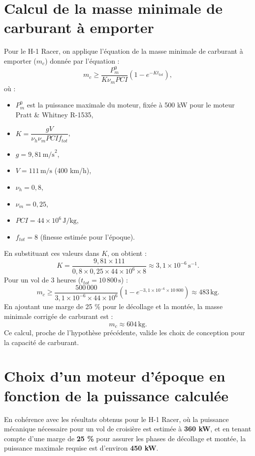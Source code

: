 \documentclass[12pt,a4paper]{article}
\begin{document}
\section{Calcul de la masse minimale de carburant à emporter}

Pour le H-1 Racer, on applique l’équation de la masse minimale de carburant à emporter ($m_c$) donnée par l’équation :
\[
m_c \geq \frac{P_m^0}{K \nu_m PCI} \left( 1 - e^{-K t_{tot}} \right),
\]
où :
\begin{itemize}
    \item $P_m^0$ est la puissance maximale du moteur, fixée à 500 kW pour le moteur Pratt \& Whitney R-1535,
    \item $K = \dfrac{gV}{\nu_h \nu_m PCI f_{tot}}$,
    \item $g = 9{,}81 \, \text{m/s}^2$,
    \item $V = 111 \, \text{m/s}$ (400 km/h),
    \item $\nu_h = 0{,}8$,
    \item $\nu_m = 0{,}25$,
    \item $PCI = 44 \times 10^6 \, \text{J/kg}$,
    \item $f_{tot} = 8$ (finesse estimée pour l’époque).
\end{itemize}

En substituant ces valeurs dans $K$, on obtient :
\[
K = \frac{9{,}81 \times 111}{0{,}8 \times 0{,}25 \times 44 \times 10^6 \times 8} \approx 3{,}1 \times 10^{-6} \, \text{s}^{-1}.
\]
Pour un vol de 3 heures ($t_{tot} = 10\,800 \, \text{s}$) :
\[
m_c \geq \frac{500\,000}{3{,}1 \times 10^{-6} \times 44 \times 10^6} \left( 1 - e^{-3{,}1 \times 10^{-6} \times 10\,800} \right) \approx 483 \, \text{kg}.
\]
En ajoutant une marge de 25 \% pour le décollage et la montée, la masse minimale corrigée de carburant est :
\[
m_c \approx 604 \, \text{kg}.
\]
Ce calcul, proche de l’hypothèse précédente, valide les choix de conception pour la capacité de carburant.

\section{Choix d’un moteur d’époque en fonction de la puissance calculée}

En cohérence avec les résultats obtenus pour le H-1 Racer, où la puissance mécanique nécessaire pour un vol de croisière est estimée à \textbf{360 kW}, et en tenant compte d’une marge de \textbf{25 \%} pour assurer les phases de décollage et montée, la puissance maximale requise est d’environ \textbf{450 kW}.
\end{document}
